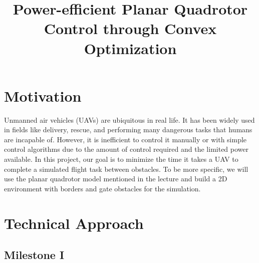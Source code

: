 \documentclass[conference]{IEEEtran}
\begin{document}
\title{Power-efficient Planar Quadrotor Control through Convex Optimization}

\maketitle

\section{\textbf{Motivation}}

Unmanned air vehicles (UAVs) are ubiquitous in real life. It has been widely used in fields like delivery, rescue, and performing many dangerous tasks that humans are incapable of. However, it is inefficient to control it manually or with simple control algorithms due to the amount of control required and the limited power available. In this project, our goal is to minimize the time it takes a UAV to complete a simulated flight task between obstacles. To be more specific, we will use the planar quadrotor model mentioned in the lecture and build a 2D environment with borders and gate obstacles for the simulation.


\section{\textbf{Technical Approach}}

\subsection*{Milestone I}
\end{document}
